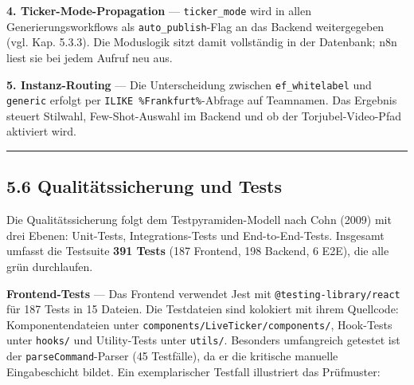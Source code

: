 \textbf{4. Ticker-Mode-Propagation} --- \texttt{ticker\_mode} wird in
allen Generierungsworkflows als \texttt{auto\_publish}-Flag an das
Backend weitergegeben (vgl. Kap. 5.3.3). Die Moduslogik sitzt damit
vollständig in der Datenbank; n8n liest sie bei jedem Aufruf neu aus.

\textbf{5. Instanz-Routing} --- Die Unterscheidung zwischen
\texttt{ef\_whitelabel} und \texttt{generic} erfolgt per
\texttt{ILIKE\ \textquotesingle{}\%Frankfurt\%\textquotesingle{}}-Abfrage
auf Teamnamen. Das Ergebnis steuert Stilwahl, Few-Shot-Auswahl im
Backend und ob der Torjubel-Video-Pfad aktiviert wird.

\begin{center}\rule{0.5\linewidth}{0.5pt}\end{center}

\subsection{5.6 Qualitätssicherung und
Tests}\label{qualituxe4tssicherung-und-tests}

Die Qualitätssicherung folgt dem Testpyramiden-Modell nach Cohn (2009)
mit drei Ebenen: Unit-Tests, Integrations-Tests und End-to-End-Tests.
Insgesamt umfasst die Testsuite \textbf{391 Tests} (187 Frontend, 198
Backend, 6 E2E), die alle grün durchlaufen.

\textbf{Frontend-Tests} --- Das Frontend verwendet Jest mit
\texttt{@testing-library/react} für 187 Tests in 15 Dateien. Die
Testdateien sind kolokiert mit ihrem Quellcode: Komponentendateien unter
\texttt{components/LiveTicker/components/}, Hook-Tests unter
\texttt{hooks/} und Utility-Tests unter \texttt{utils/}. Besonders
umfangreich getestet ist der \texttt{parseCommand}-Parser (45
Testfälle), da er die kritische manuelle Eingabeschicht bildet. Ein
exemplarischer Testfall illustriert das Prüfmuster:

